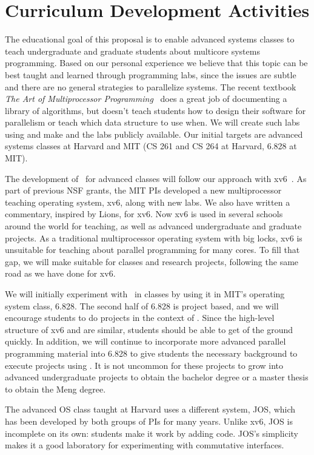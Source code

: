 \section{Curriculum Development Activities}
\label{sec:education}

The educational goal of this proposal is to enable advanced systems classes to
teach undergraduate and graduate students about multicore systems programming.
Based on our personal experience we believe that this topic can be best taught
and learned through programming labs, since the issues are subtle and there are
no general strategies to parallelize systems.
%
The recent textbook \emph{The Art of Multiprocessor
Programming}~\cite{herlihy:art} does a great job of documenting a library of
algorithms, but doesn't teach students how to design their software for
parallelism or teach which data structure to use when.  We will create such labs
using \sys and make \sys and the labs publicly available. Our initial targets are
advanced systems classes at Harvard and MIT (CS 261 and CS 264 at Harvard,
6.828 at MIT).

The development of \sys\ for advanced classes will follow our approach with
xv6~\cite{xv6}. As part of previous NSF
grants, the MIT PIs developed a new multiprocessor teaching operating system, xv6, along
with new labs.  We also have written a commentary, inspired by Lions, for xv6.
Now xv6 is used in several schools around the world for teaching, as well as
advanced undergraduate and graduate projects.  As a traditional
multiprocessor operating system with big locks, xv6 is unsuitable for teaching
about parallel programming for many cores.  To fill that gap, we will make \sys
suitable for classes and research projects, following the same road as we have
done for xv6.

We will initially experiment with \sys\ in classes by using it in MIT's operating
system class, 6.828.  The second half of 6.828 is project
based, and we will encourage students to do projects in the context of \sys.
Since the high-level structure of xv6 and \sys are similar, students should be
able to get of the ground quickly.  In addition, we will continue to incorporate
more advanced parallel programming material into 6.828 to give students the
necessary background to execute projects using \sys.  It is not uncommon for
these projects to grow into advanced undergraduate projects to obtain the
bachelor degree or a master thesis to obtain the Meng degree.

The advanced OS class taught at Harvard uses a different system, JOS,
which has been developed by both groups of PIs for many
years.
%
Unlike xv6, JOS is incomplete on its own: students make it work by
adding code.
%
JOS's simplicity makes it a good laboratory for experimenting with
commutative interfaces.

